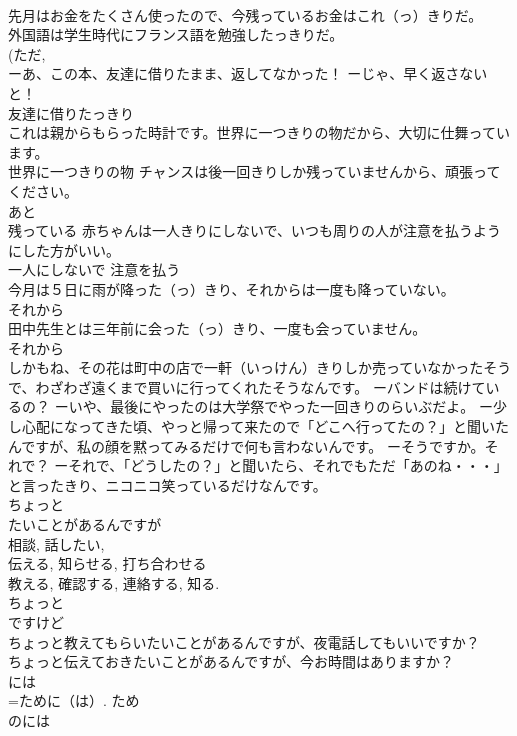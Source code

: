 \documentclass[8pt]{extreport}
\begin{document}
\begin{CJK}{UTF8}{min}
\\	先月はお金をたくさん使ったので、今残っているお金はこれ（っ）きりだ。 
\\	外国語は学生時代にフランス語を勉強したっきりだ。 
\\	(ただ, 
\\	ーあ、この本、友達に借りたまま、返してなかった！ ーじゃ、早く返さないと！ 
\\	友達に借りたっきり 
\\	これは親からもらった時計です。世界に一つきりの物だから、大切に仕舞っています。 
\\	世界に一つきりの物 チャンスは後一回きりしか残っていませんから、頑張ってください。 
\\	あと
\\	残っている 赤ちゃんは一人きりにしないで、いつも周りの人が注意を払うようにした方がいい。 
\\	一人にしないで 注意を払う 
\\	今月は５日に雨が降った（っ）きり、それからは一度も降っていない。 
\\	それから 
\\	田中先生とは三年前に会った（っ）きり、一度も会っていません。 
\\	それから 
\\	しかもね、その花は町中の店で一軒（いっけん）きりしか売っていなかったそうで、わざわざ遠くまで買いに行ってくれたそうなんです。 ーバンドは続けているの？ ーいや、最後にやったのは大学祭でやった一回きりのらいぶだよ。 ー少し心配になってきた頃、やっと帰って来たので「どこへ行ってたの？」と聞いたんですが、私の顔を黙ってみるだけで何も言わないんです。 ーそうですか。それで？ ーそれで、「どうしたの？」と聞いたら、それでもただ「あのね・・・」と言ったきり、ニコニコ笑っているだけなんです。
\\	ちょっと
\\	たいことがあるんですが	
\\	相談, 話したい, 
\\	伝える, 知らせる, 打ち合わせる 
\\	教える, 確認する, 連絡する, 知る. 
\\	ちょっと
\\	ですけど 
\\	ちょっと教えてもらいたいことがあるんですが、夜電話してもいいですか？ 
\\	ちょっと伝えておきたいことがあるんですが、今お時間はありますか？ 
\\	には	
\\	=ために（は）. ため 
\\	のには 

\end{CJK}
\end{document}
